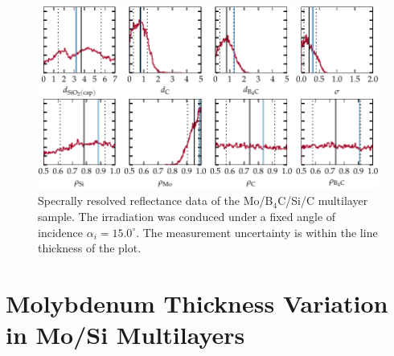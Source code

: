 \begin{figure}[htbp]
\centering
\includegraphics{img/PTB17_MCMC_other_params}
\caption{Specrally resolved reflectance data of the Mo/B$_4$C/Si/C multilayer sample. The irradiation was conduced under a fixed angle of incidence $\alpha_i = 15.0^\circ$. The measurement uncertainty is within the line thickness of the plot.}
\label{ch_spec:fig_ptb17_MCMC_other_params}
\end{figure}



\section{Molybdenum Thickness Variation in Mo/Si Multilayers}

